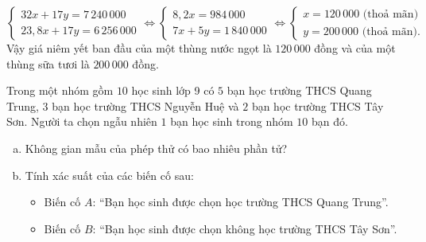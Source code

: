 \begin{bt}
{$$ \begin{cases} 32x + 17y = 7\,240\,000 \\ 23{,}8x + 17y = 6\,256\,000 \end{cases} \iff \begin{cases} 8{,}2x = 984\,000 \\ 7x + 5y = 1\,840\,000 \end{cases} \iff \begin{cases} x = 120\,000\text{ (thoả mãn)} \\ y = 200\,000\text{ (thoả mãn)}. \end{cases} $$
Vậy giá niêm yết ban đầu của một thùng nước ngọt là $120\,000$ đồng và của một thùng sữa tươi là $200\,000$ đồng.
}
\end{bt}

\begin{bt}%
Trong một nhóm gồm $10$ học sinh lớp 9 có $5$ bạn học trường THCS Quang Trung, $3$ bạn học trường THCS Nguyễn Huệ và $2$ bạn học trường THCS Tây Sơn. Người ta chọn ngẫu nhiên $1$ bạn học sinh trong nhóm $10$ bạn đó.
\begin{enumerate}[a)]
	\item Không gian mẫu của phép thử có bao nhiêu phần tử?
	\item Tính xác suất của các biến cố sau:
	\begin{itemize}
		\item Biến cố $A$: ``Bạn học sinh được chọn học trường THCS Quang Trung''.
		\item Biến cố $B$: ``Bạn học sinh được chọn không học trường THCS Tây Sơn''.
	\end{itemize}
\end{enumerate}
\end{bt}

